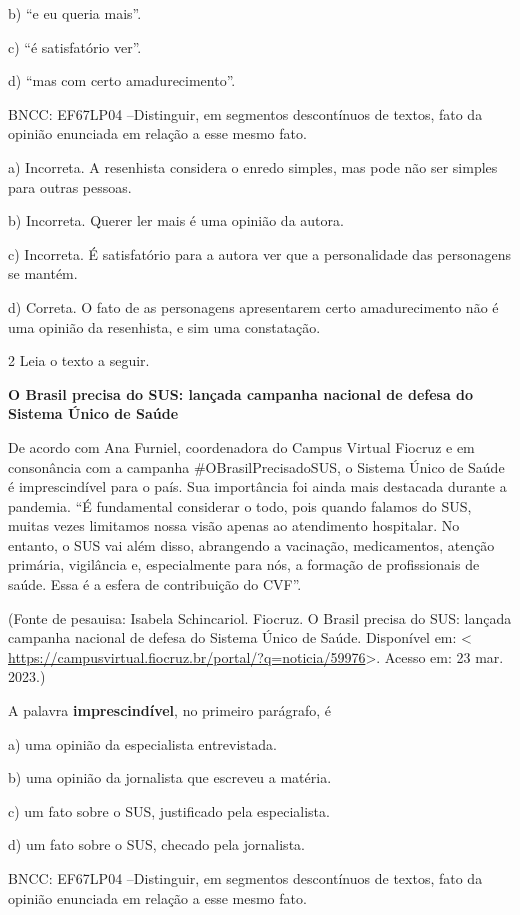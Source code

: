 {b) ``e eu queria mais''.

c) ``é satisfatório ver''.

d) ``mas com certo amadurecimento''.

BNCC: EF67LP04 --Distinguir, em segmentos descontínuos de textos, fato
da opinião enunciada em relação a esse mesmo fato.

a) Incorreta. A resenhista considera o enredo simples, mas pode não ser
simples para outras pessoas.

b) Incorreta. Querer ler mais é uma opinião da autora.

c) Incorreta. É satisfatório para a autora ver que a personalidade das
personagens se mantém.

d) Correta. O fato de as personagens apresentarem certo amadurecimento
não é uma opinião da resenhista, e sim uma constatação.

\num{2} Leia o texto a seguir.

\textbf{O Brasil precisa do SUS: lançada campanha nacional de defesa do
Sistema Único de Saúde}

De acordo com Ana Furniel, coordenadora do Campus Virtual Fiocruz e em
consonância com a campanha \#OBrasilPrecisadoSUS, o Sistema Único de
Saúde é imprescindível para o país. Sua importância foi ainda mais
destacada durante a pandemia. ``É fundamental considerar o todo, pois
quando falamos do SUS, muitas vezes limitamos nossa visão apenas ao
atendimento hospitalar. No entanto, o SUS vai além disso, abrangendo a
vacinação, medicamentos, atenção primária, vigilância e, especialmente
para nós, a formação de profissionais de saúde. Essa é a esfera de
contribuição do CVF''.

(Fonte de pesauisa: Isabela Schincariol. Fiocruz. O Brasil precisa do
SUS: lançada campanha nacional de defesa do Sistema Único de Saúde.
Disponível em: \textless{}
\url{https://campusvirtual.fiocruz.br/portal/?q=noticia/59976}\textgreater.
Acesso em: 23 mar. 2023.)

A palavra \textbf{imprescindível}, no primeiro parágrafo, é

a) uma opinião da especialista entrevistada.

b) uma opinião da jornalista que escreveu a matéria.

c) um fato sobre o SUS, justificado pela especialista.

d) um fato sobre o SUS, checado pela jornalista.

BNCC: EF67LP04 --Distinguir, em segmentos descontínuos de textos, fato
da opinião enunciada em relação a esse mesmo fato.

}
